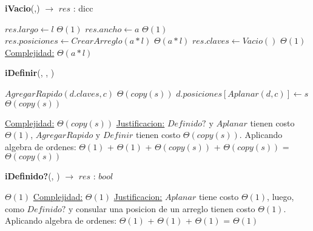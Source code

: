 \begin{Algoritmos}

\medskip
	
  	\medskip
  
\begin{algorithm}[H]{\textbf{iVacio}(,) $\to$ $res$ : dicc}
    	\begin{algorithmic}[1]
			\State $res.largo \gets l$ \Comment $\Theta(1)$
			\State $res.ancho \gets a$ \Comment $\Theta(1)$
			\State $res.posiciones \gets CrearArreglo(a * l)$ \Comment $\Theta(a*l)$
			\State $res.claves \gets Vacio()$ \Comment $\Theta(1)$
			\medskip
			\Statex \underline{Complejidad:} $\Theta(a*l)$
        \end{algorithmic}
\end{algorithm}

\begin{algorithm}[H]{\textbf{iDefinir}(, , )}
    	\begin{algorithmic}[1]
                \State $AgregarRapido(d.claves, c)$ \Comment $\Theta(copy(s))$
            \EndIf
            \State $d.posiciones[Aplanar(d, c)] \gets s$ \Comment $\Theta(copy(s))$
			
			\medskip
			\Statex \underline{Complejidad:} $\Theta(copy(s))$
            \Statex \underline{Justificacion:} $Definido?$ y $Aplanar$ tienen costo $\Theta(1)$, $AgregarRapido$ y $Definir$ tienen costo $\Theta(copy(s))$. Aplicando algebra de ordenes: $\Theta(1)$ + $\Theta(1)$ + $\Theta(copy(s))$  + $\Theta(copy(s))$ = $\Theta(copy(s))$
        \end{algorithmic}
\end{algorithm}

\begin{algorithm}[H]{\textbf{iDefinido?}(, ) $\to$ $res$ : $bool$}
    	\begin{algorithmic}[1]
          $\Theta(1)$
			\medskip
			\Statex \underline{Complejidad:} $\Theta(1)$
            \Statex \underline{Justificacion:} $Aplanar$ tiene costo $\Theta(1)$, luego, como $Definido?$ y consular una posicion de un arreglo tienen costo $\Theta(1)$. Aplicando algebra de ordenes: $\Theta(1)$ + $\Theta(1)$ + $\Theta(1)$ = $\Theta(1)$
        \end{algorithmic}
\end{algorithm}


\end{Algoritmos}
